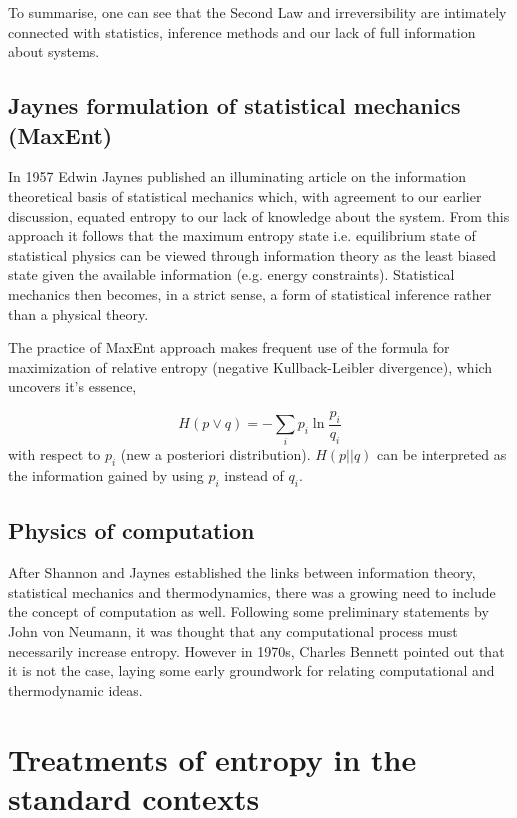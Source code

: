 \documentclass[a4paper,12pt]{article}
\begin{document}
To summarise, one can see that the Second Law and irreversibility are intimately connected with statistics, inference methods and our lack of full information about systems.

\subsection{Jaynes formulation of statistical mechanics (MaxEnt)}

In 1957 Edwin Jaynes published an illuminating article on the information theoretical basis of statistical mechanics which, with agreement to our earlier discussion, equated entropy to our lack of knowledge about the system. From this approach it follows that the maximum entropy state i.e. equilibrium state of statistical physics can be viewed through information theory as the least biased state given the available information (e.g. energy constraints).
Statistical mechanics then becomes, in a strict sense, a form of statistical inference rather than a physical theory.

The practice of MaxEnt approach makes frequent use of the formula for maximization of relative entropy (negative Kullback-Leibler divergence), which uncovers it's essence,

\begin{displaymath}
  H(p\lor q) = -\sum_i p_i \ln \frac{p_i}{q_i}
\end{displaymath}
with respect to $p_i$ (new a posteriori distribution). $H(p||q)$ can be interpreted as the information gained by using $p_i$ instead of $q_i$.

\subsection{Physics of computation}

After Shannon and Jaynes established the links between information theory, statistical mechanics and thermodynamics, there was a growing need to include the concept of computation as well. Following some preliminary statements by John von Neumann, it was thought that any computational process must necessarily increase entropy.
However in 1970s, Charles Bennett pointed out that it is not the case\cite{Bennett:1973ko}, laying some early groundwork for relating computational and thermodynamic ideas. 


\section{Treatments of entropy in the standard contexts}
\end{document}
